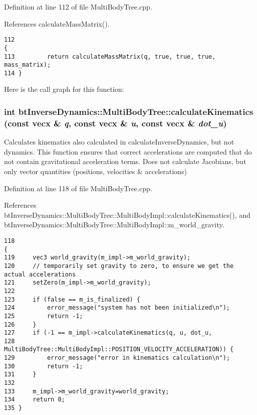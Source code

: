 Definition at line 112 of file MultiBodyTree.cpp.

References calculateMassMatrix().

\begin{Code}\begin{verbatim}112                                                                         {
113         return calculateMassMatrix(q, true, true, true, mass_matrix);
114 }
\end{verbatim}
\end{Code}




Here is the call graph for this function:\hypertarget{classbt_inverse_dynamics_1_1_multi_body_tree_fa6df6ee25f28a4de404d82c6bbf78ff}{
\subsubsection[calculateKinematics]{\setlength{\rightskip}{0pt plus 5cm}int btInverseDynamics::MultiBodyTree::calculateKinematics (const vecx \& {\em q}, \/  const vecx \& {\em u}, \/  const vecx \& {\em dot\_\-u})}}
\label{classbt_inverse_dynamics_1_1_multi_body_tree_fa6df6ee25f28a4de404d82c6bbf78ff}


Calculates kinematics also calculated in calculateInverseDynamics, but not dynamics. This function ensures that correct accelerations are computed that do not contain gravitational acceleration terms. Does not calculate Jacobians, but only vector quantities (positions, velocities \& accelerations) 

Definition at line 118 of file MultiBodyTree.cpp.

References btInverseDynamics::MultiBodyTree::MultiBodyImpl::calculateKinematics(), and btInverseDynamics::MultiBodyTree::MultiBodyImpl::m\_\-world\_\-gravity.

\begin{Code}\begin{verbatim}118                                                                                       {
119     vec3 world_gravity(m_impl->m_world_gravity);
120     // temporarily set gravity to zero, to ensure we get the actual accelerations
121     setZero(m_impl->m_world_gravity);
122 
123     if (false == m_is_finalized) {
124         error_message("system has not been initialized\n");
125         return -1;
126     }
127     if (-1 == m_impl->calculateKinematics(q, u, dot_u,
128                                           MultiBodyTree::MultiBodyImpl::POSITION_VELOCITY_ACCELERATION)) {
129         error_message("error in kinematics calculation\n");
130         return -1;
131     }
132 
133     m_impl->m_world_gravity=world_gravity;
134     return 0;
135 }
\end{verbatim}
\end{Code}




